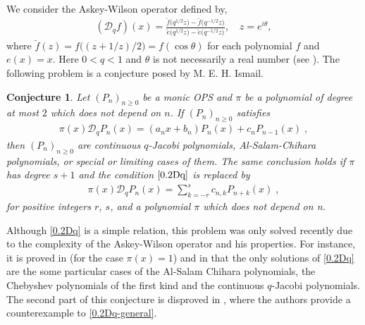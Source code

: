 \documentclass{amsart}
\newtheorem{conjecture}[theorem]{Conjecture}
\theoremstyle{remark}
\numberwithin{equation}{section}
\begin{document}
 We consider the Askey-Wilson operator defined by,
\begin{align}
(\mathcal{D}_q  f)(x)=\frac{\breve{f}\big(q^{1/2} z\big)
-\breve{f}\big(q^{-1/2} z\big)}{\breve{e}\big(q^{1/2}z\big)-\breve{e}\big(q^{-1/2} z\big)},\quad
z=e^{i\theta}, \label{0.3}
\end{align}
where $\breve{f}(z)=f\big((z+1/z)/2\big)=f(\cos \theta)$ for each polynomial $f$ and $e(x)=x$.
Here $0<q<1$ and $\theta$ is not necessarily a real number (see \cite[p.\,300]{IsmailBook2005}). The following problem \cite[Conjecture 24.7.8]{IsmailBook2005} is a conjecture posed by M. E. H. Ismail. 
\begin{conjecture}\label{IsmailConj2478}
Let $(P_n)_{n\geq0}$ be a monic OPS and $\pi$ be a polynomial of degree at most $2$
which does not depend on $n$. If $(P_n)_{n\geq0}$ satisfies
\begin{align}
\pi(x)\mathcal{D}_q P_n (x)= (a_n x+b_n)P_n (x) + c_n P_{n-1} (x)\;, \label{0.2Dq}
\end{align}
then $(P_n)_{n\geq0}$ are continuous $q$-Jacobi polynomials, Al-Salam-Chihara polynomials,
or special or limiting cases of them. The same conclusion holds if $\pi$ has degree
$s+1$ and the condition $\eqref{0.2Dq}$ is replaced by
\begin{align}\label{0.2Dq-general}
\pi(x)\mathcal{D}_qP_n(x)=\sum_{k=-r} ^{s} c_{n,k}P_{n+k}(x)\;,
\end{align}
for positive integers $r$, $s$, and a polynomial $\pi$ which does not depend on n.
\end{conjecture}
Although \eqref{0.2Dq} is a simple relation, this problem was only solved recently due to the complexity of the Askey-Wilson operator and his properties. For instance, it is proved in \cite{Al-Salam1995} (for the case $\pi(x)=1$) and in \cite{KCDMJP2021c} that the only solutions of \eqref{0.2Dq} are the some particular cases of the Al-Salam Chihara polynomials, the Chebyshev polynomials of the first kind and the continuous $q$-Jacobi polynomials. The second part of this conjecture is disproved in \cite{KCDM2022}, where the authors provide a counterexample to \eqref{0.2Dq-general}.
\end{document}
